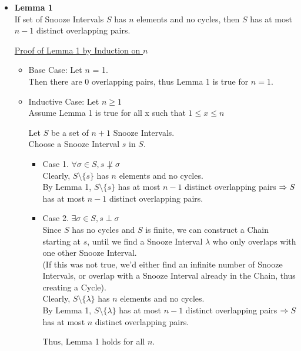 \documentclass[fleqn]{article}
\newcommand{\set}[1]{\lbrace #1 \rbrace}
\newcommand{\ioverlap}{\perp}
\begin{document}
\begin{itemize}
  \item \textbf{Lemma 1}\\
        If set of Snooze Intervals $S$ has $n$ elements and no cycles,
        then $S$ has at most $n-1$ distinct overlapping pairs.

        \underline{Proof of Lemma 1 by Induction on $n$}
        \begin{itemize}
          \item Base Case: Let $n$ = 1.\\
                Then there are 0 overlapping pairs, thus
                Lemma 1 is true for $n=1$.
          \item Inductive Case: Let $n \geq 1$\\
                Assume Lemma 1 is true for all x such that $1 \leq x \leq n$

                Let $S$ be a set of $n+1$ Snooze Intervals.\\
                Choose a Snooze Interval $s$ in $S$.

                \begin{itemize}
                  \item Case 1. $\forall \sigma \in S, s \not\ioverlap \sigma$\\
                        Clearly, $S \setminus \set{s}$ has
                        $n$ elements and no cycles.\\
                        By Lemma 1, $S \setminus \set{s}$ has at most 
                        $n-1$ distinct overlapping pairs $\Rightarrow\\
                        S$ has at most $n-1$ distinct overlapping pairs.
                  \item Case 2. $\exists \sigma \in S, s \ioverlap \sigma$\\
                        Since $S$ has no cycles and $S$ is finite, we
                        can construct a Chain starting at $s$, until
                        we find a Snooze Interval $\lambda$ who only
                        overlaps with one other Snooze Interval.\\
                        (If this was not true, we'd either find an
                         infinite number of Snooze Intervals, or 
                         overlap with a Snooze Interval already in 
                         the Chain, thus creating a Cycle).\\
                        Clearly, $S \setminus \set{\lambda}$ has
                        $n$ elements and no cycles.\\
                        By Lemma 1, $S \setminus \set{\lambda}$ has at
                        most $n-1$ distinct overlapping pairs $\Rightarrow\\
                        S$ has at most $n$ distinct overlapping pairs.
                        
                        Thus, Lemma 1 holds for all $n$.
                \end{itemize}
        \end{itemize}

\end{itemize}
\end{document}
